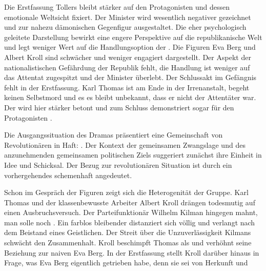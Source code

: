 Die Erstfassung Tollers bleibt stärker auf den Protagonisten und dessen
emotionale Weltsicht fixiert. Der Minister wird
wesentlich negativer gezeichnet und zur nahezu dämonischen Gegenfigur
ausgestaltet. Die eher psychologisch geleitete Darstellung bewirkt eine 
engere Perspektive auf die republikanische Welt und legt weniger Wert auf die
Handlungsoption der . Die Figuren Eva Berg und
Albert Kroll sind schwächer und weniger engagiert dargestellt. Der Aspekt der
nationalistischen Gefährdung der Republik fehlt, die Handlung ist weniger auf
das Attentat zugespitzt und der Minister überlebt. Der Schlussakt im Gefängnis
fehlt in der Erstfassung. Karl Thomas ist am Ende in der Irrenanstalt,
begeht keinen Selbstmord und es es bleibt unbekannt, dass er nicht
der Attentäter war. Der  wird hier stärker betont und
zum Schluss demonstriert sogar \Cite{das Volk} für den Protagonisten
.


Die Ausgangssituation des Dramas präsentiert eine Gemeinschaft von
Revolutionären in Haft: \Cite{Zeit 1919} . Der Kontext der
gemeinsamen Zwangslage und des anzunehmenden gemeinsamen politischen Ziels
suggeriert zunächst ihre Einheit in Idee und Schicksal. Der Bezug zur
revolutionären Situation ist durch ein vorhergehendes \Cite{Filmisches
  Vorspiel} schemenhaft angedeutet.

Schon im Gespräch der Figuren zeigt sich die Heterogenität der Gruppe. Karl
Thomas und der klassenbewusste Arbeiter Albert Kroll drängen todesmutig auf
einen Ausbruchsversuch. Der Parteifunktionär Wilhelm Kilman hingegen mahnt,
man solle noch \Cite{überlegen} . Ein farblos bleibender
\Cite{sechster Gefangener} distanziert sich völlig und verlangt nach dem
Beistand eines Geistlichen. Der Streit über die Unzuverlässigkeit Kilmans
schwächt den Zusammenhalt. Kroll beschimpft Thomas als \Cite{Bürgersöhnchen}
 und verhöhnt seine Beziehung zur naiven Eva Berg. In der
Erstfassung stellt Kroll darüber hinaus in Frage, was Eva Berg eigentlich
\Cite{in unsern Kampf} getrieben habe, denn sie sei von \Cite{reich[er]}
Herkunft und \Cite{hatte es nicht nötig.}

